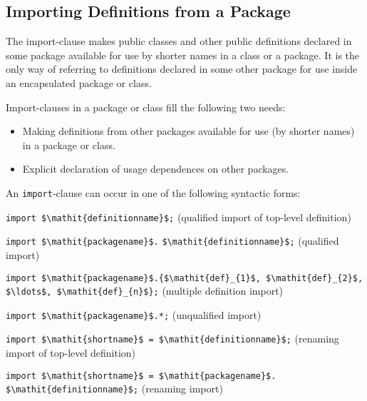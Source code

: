 \subsection{Importing Definitions from a Package}\label{importing-definitions-from-a-package}

The import-clause makes public classes and other public definitions
declared in some package available for use by shorter names in a class
or a package. It is the only way of referring to definitions declared in
some other package for use inside an encapsulated package or class.

\begin{nonnormative}
Import-clauses in a package or class fill the following two needs:
\begin{itemize}
\item
  Making definitions from other packages available for use (by shorter
  names) in a package or class.
\item
  Explicit declaration of usage dependences on other packages.
\end{itemize}
\end{nonnormative}

An \lstinline!import!-clause can occur in one of the following syntactic forms:


\lstinline!import $\mathit{definitionname}$;! (qualified import of top-level definition)

\lstinline!import $\mathit{packagename}$.!%
\lstinline!$\mathit{definitionname}$;! (qualified import)

\lstinline!import $\mathit{packagename}$.{$\mathit{def}_{1}$, $\mathit{def}_{2}$, $\ldots$, $\mathit{def}_{n}$};! (multiple definition import)

\lstinline!import $\mathit{packagename}$.*;! (unqualified import)

\lstinline!import $\mathit{shortname}$ = $\mathit{definitionname}$;! (renaming import of top-level definition)

\lstinline!import $\mathit{shortname}$ = $\mathit{packagename}$.!%
\lstinline!$\mathit{definitionname}$;! (renaming import)

